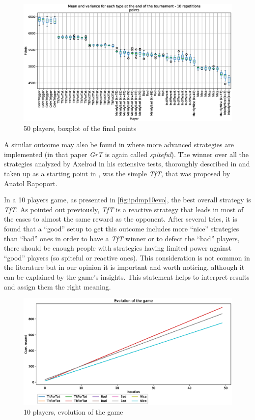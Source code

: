 \documentclass[journal,10pt,twoside]{IEEEtran}
\begin{document}
\begin{figure}[!ht]
    \centering
    \includegraphics[width=1\columnwidth]{../img/ipdmp/ipdmp-boxplot-final-points-50}
    \caption{50 players, boxplot of the final points}
    \label{fig:ipdmp50boxfinal}
\end{figure}

A similar outcome may also be found in \cite{mathieu2017} where more advanced strategies are implemented (in that paper \textit{GrT} is again called \textit{spiteful}).
The winner over all the strategies analyzed by Axelrod in his extensive tests, thoroughly described in \cite{axelrod1981evolution,axelrod1984evolution} and taken up as a starting point in \cite{mathieu2017}, was the simple \textit{TfT}, that was proposed by Anatol Rapoport.

In a 10 players game, as presented in \autoref{fig:ipdmp10evo}, the best overall strategy is \textit{TfT}. As pointed out previously, \textit{TfT} is a reactive strategy that leads in most of the cases to almost the same reward as the opponent. After several tries, it is found that a ``good'' setup to get this outcome includes more ``nice'' strategies than ``bad'' ones in order to have a \textit{TfT} winner or to defect the ``bad'' players, there should be enough people with strategies having limited power against ``good'' players (so spiteful or reactive ones). This consideration is not common in the literature but in our opinion it is important and worth noticing, although it can be explained by the game's insights. This statement helps to interpret results and assign them the right meaning.

\begin{figure}[!ht]
    \centering
    \includegraphics[width=1\columnwidth]{../img/ipdmp/ipdmp-evolution-of-game-10}
    \caption{10 players, evolution of the game}
    \label{fig:ipdmp10evo}
\end{figure}
\end{document}

